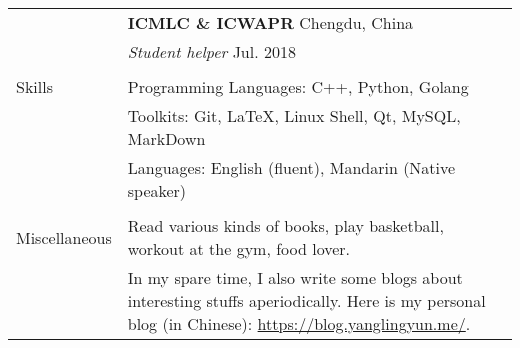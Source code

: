 \documentclass[letterpaper, 11pt]{article}
\begin{document}
\begin{longtable}{p{1in}p{5in}}
& \textbf{ICMLC \& ICWAPR} \hfill Chengdu, China \\
& \textit{Student helper} \hfill Jul. 2018 \\

& \\

\nohyphens{Skills}
& Programming Languages: C++, Python, Golang \\
& Toolkits: Git, \LaTeX, Linux Shell, Qt, MySQL, MarkDown \\
& Languages: English (fluent), Mandarin (Native speaker) \\
& \\


\nohyphens{Miscellaneous}
& Read various kinds of books, play basketball, workout at the gym, food lover. \\
& In my spare time, I also write some blogs about interesting stuffs aperiodically. Here is my personal blog (in Chinese): \href{https://blog.yanglingyun.me/}{https://blog.yanglingyun.me/}. \\


\end{longtable}
\end{document}
